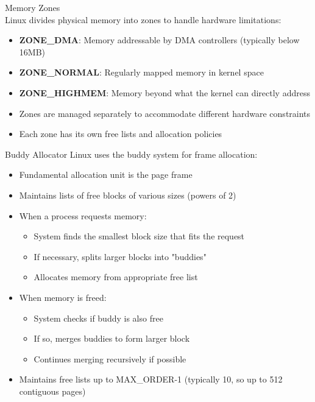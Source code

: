 \multend

\begin{concept}{Memory Zones}\\
    Linux divides physical memory into zones to handle hardware limitations:
    \begin{itemize}
        \item \textbf{ZONE\_DMA}: Memory addressable by DMA controllers (typically below 16MB)
        \item \textbf{ZONE\_NORMAL}: Regularly mapped memory in kernel space
        \item \textbf{ZONE\_HIGHMEM}: Memory beyond what the kernel can directly address
        \item Zones are managed separately to accommodate different hardware constraints
        \item Each zone has its own free lists and allocation policies
    \end{itemize}
\end{concept}

\begin{theorem}{Buddy Allocator}
    Linux uses the buddy system for frame allocation:
    \begin{itemize}
        \item Fundamental allocation unit is the page frame
        \item Maintains lists of free blocks of various sizes (powers of 2)
        \item When a process requests memory:
            \begin{itemize}
                \item System finds the smallest block size that fits the request
                \item If necessary, splits larger blocks into "buddies"
                \item Allocates memory from appropriate free list
            \end{itemize}
        \item When memory is freed:
            \begin{itemize}
                \item System checks if buddy is also free
                \item If so, merges buddies to form larger block
                \item Continues merging recursively if possible
            \end{itemize}
        \item Maintains free lists up to MAX\_ORDER-1 (typically 10, so up to 512 contiguous pages)
    \end{itemize}
\end{theorem}

